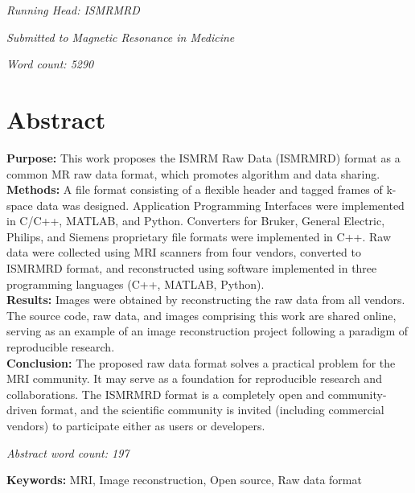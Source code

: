 \documentclass[12pt, draft]{article}
\begin{document}
\textit{Running Head:  ISMRMRD}


\textit{Submitted to Magnetic Resonance in Medicine} 


\textit{Word count: 5290}

\newpage
\clearpage
{} %
\pagestyle{plain}
\doublespacing
\section*{Abstract}
\textbf{Purpose:}  This work proposes the ISMRM Raw Data (ISMRMRD) format as a common MR raw data format, which promotes algorithm and data sharing.\\
\textbf{Methods:} A file format consisting of a flexible header and tagged frames of k-space data was designed. Application Programming Interfaces were implemented in C/C++, MATLAB, and Python. Converters for Bruker, General Electric, Philips, and Siemens proprietary file formats were implemented in C++. Raw data were collected using MRI scanners from four vendors, converted to ISMRMRD format, and reconstructed using software implemented in three programming languages (C++, MATLAB, Python).\\
\textbf{Results:} Images were obtained by reconstructing the raw data from all vendors. The source code, raw data, and images comprising this work are shared online, serving as an example of an image reconstruction project following a paradigm of reproducible research.\\
\textbf{Conclusion:} The proposed raw data format solves a practical problem for the MRI community.  It may serve as a foundation for reproducible research and collaborations.  The ISMRMRD format is a completely open and community-driven format, and the scientific community is invited (including commercial vendors) to participate either as users or developers.

\textit{Abstract word count: 197} %

\textbf{Keywords:}  MRI, Image reconstruction, Open source, Raw data format
\end{document}
